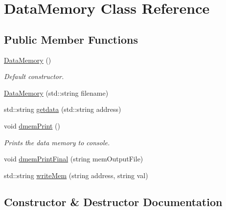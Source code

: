 \hypertarget{class_data_memory}{}\section{Data\+Memory Class Reference}
\label{class_data_memory}
\subsection*{Public Member Functions}
\begin{DoxyCompactItemize}
\item 
\mbox{\label{class_data_memory_af27e74a463cfa8d051d1fdc7a1a1c2b0}} 
\mbox{\hyperlink{class_data_memory_af27e74a463cfa8d051d1fdc7a1a1c2b0}{Data\+Memory}} ()
\begin{DoxyCompactList}\small\item\em Default constructor. \end{DoxyCompactList}\item 
\mbox{\hyperlink{class_data_memory_a599d160106c78e0371bdb59d815b7868}{Data\+Memory}} (std\+::string filename)
\item 
std\+::string \mbox{\hyperlink{class_data_memory_ae360f23f4085e52acdfddd56e1a32909}{getdata}} (std\+::string address)
\item 
\mbox{\label{class_data_memory_a6da7c9bd0cf4ed80de85f92a201de0a2}} 
void \mbox{\hyperlink{class_data_memory_a6da7c9bd0cf4ed80de85f92a201de0a2}{dmem\+Print}} ()
\begin{DoxyCompactList}\small\item\em Prints the data memory to console. \end{DoxyCompactList}\item 
void \mbox{\hyperlink{class_data_memory_a82f942ff85aeac08d6452bb4c42d891f}{dmem\+Print\+Final}} (string mem\+Output\+File)
\item 
std\+::string \mbox{\hyperlink{class_data_memory_ac9c4f2b4ce44214f8043d84edd35e9c4}{write\+Mem}} (string address, string val)
\end{DoxyCompactItemize}


\subsection{Constructor \& Destructor Documentation}
\mbox{\label{class_data_memory_a599d160106c78e0371bdb59d815b7868}} 
